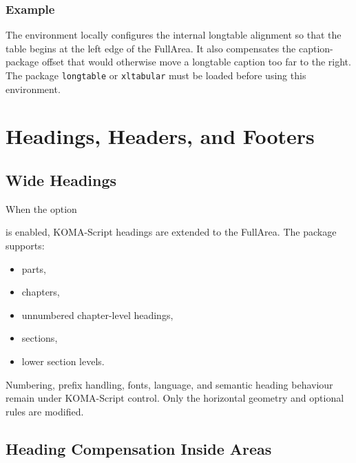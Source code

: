 \documentclass[
11pt,
a4paper,
oneside
]{scrbook}
\begin{document}


	
\subsection{Example}
	




The environment locally configures the internal longtable alignment so that
the table begins at the left edge of the FullArea.
It also compensates the caption-package offset that would otherwise move a
longtable caption too far to the right.
The package \texttt{longtable} or \texttt{xltabular} must be loaded before
using this environment.
	
	
\chapter{Headings, Headers, and Footers}
\label{chap:headings}
	
\section{Wide Headings}
	
When the option




is enabled, KOMA-Script headings are extended to the FullArea.
The package supports:
\begin{itemize}
	\item parts,
	\item chapters,
	\item unnumbered chapter-level headings,
	\item sections,
	\item lower section levels.
\end{itemize}
Numbering, prefix handling, fonts, language, and semantic heading behaviour
remain under KOMA-Script control.
Only the horizontal geometry and optional rules are modified.
	
\section{Heading Compensation Inside Areas}
	
\end{document}
